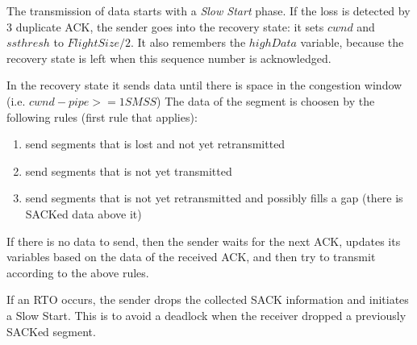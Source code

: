 The transmission of data starts with a \emph{Slow Start} phase.
If the loss is detected by 3 duplicate ACK, the sender
goes into the recovery state: it sets
$cwnd$ and $ssthresh$ to $FlightSize / 2$.
It also remembers the $highData$ variable, because
the recovery state is left when this sequence number
is acknowledged.

In the recovery state it sends data
until there is space in the congestion window (i.e. $cwnd-pipe >= 1 SMSS$)
The data of the segment is choosen by the following rules (first rule that applies):

\begin{enumerate}
  \item send segments that is lost and not yet retransmitted
  \item send segments that is not yet transmitted
  \item send segments that is not yet retransmitted and possibly fills a gap
        (there is SACKed data above it)
\end{enumerate}

If there is no data to send, then the sender waits for the next ACK, updates
its variables based on the data of the received ACK, and then try to transmit
according to the above rules.

If an RTO occurs, the sender drops the collected SACK information and
initiates a Slow Start. This is to avoid a deadlock when the receiver
dropped a previously SACKed segment.

